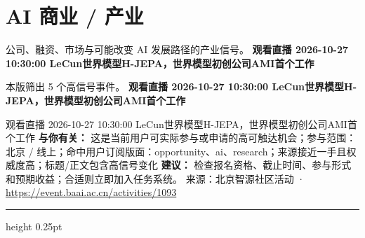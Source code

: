 \documentclass[10.5pt]{ctexart}
\begin{document}
\section*{AI 商业 / 产业}
{\color{ormuted} 公司、融资、市场与可能改变 AI 发展路径的产业信号。}
\vspace{2mm}
{\LARGE\bfseries 观看直播 2026-10-27 10:30:00 LeCun世界模型H-JEPA，世界模型初创公司AMI首个工作}\par
\vspace{1mm}
{\color{ormuted} 本版筛出 5 个高信号事件。}
\vspace{3mm}
{\Large\bfseries 观看直播 2026-10-27 10:30:00 LeCun世界模型H-JEPA，世界模型初创公司AMI首个工作}\par
观看直播 2026-10-27 10:30:00 LeCun世界模型H-JEPA，世界模型初创公司AMI首个工作
\textbf{与你有关：} 这是当前用户可实际参与或申请的高可触达机会；参与范围：北京 / 线上；命中用户订阅版面：opportunity、ai、research；来源接近一手且权威度高；标题/正文包含高信号变化
\textbf{建议：} 检查报名资格、截止时间、参与形式和预期收益；合适则立即加入任务系统。
{\footnotesize\color{ormuted} 来源：北京智源社区活动 · \url{https://event.baai.ac.cn/activities/1093}}
\vspace{4mm}
\hrule height 0.25pt
\vspace{3mm}
\end{document}
